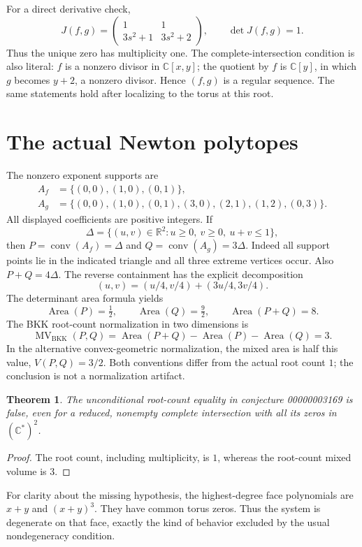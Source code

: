 \documentclass[11pt]{article}
\newtheorem{theorem}{Theorem}
\begin{document}
For a direct derivative check,
\[
 J(f,g)=\begin{pmatrix}1&1\\3s^2+1&3s^2+2\end{pmatrix},
 \qquad \det J(f,g)=1.
\]
Thus the unique zero has multiplicity one. The complete-intersection condition is also literal: $f$ is a nonzero divisor in $\mathbb C[x,y]$; the quotient by $f$ is $\mathbb C[y]$, in which $g$ becomes $y+2$, a nonzero divisor. Hence $(f,g)$ is a regular sequence. The same statements hold after localizing to the torus at this root.
\section{The actual Newton polytopes}
The nonzero exponent supports are
\begin{align*}
 A_f&=\{(0,0),(1,0),(0,1)\},\\
 A_g&=\{(0,0),(1,0),(0,1),(3,0),(2,1),(1,2),(0,3)\}.
\end{align*}
All displayed coefficients are positive integers. If
\[
 \Delta=\{(u,v)\in\mathbb R^2:u\ge0,\ v\ge0,\ u+v\le1\},
\]
then $P=\operatorname{conv}(A_f)=\Delta$ and $Q=\operatorname{conv}(A_g)=3\Delta$. Indeed all support points lie in the indicated triangle and all three extreme vertices occur. Also $P+Q=4\Delta$. The reverse containment has the explicit decomposition
\[
 (u,v)=(u/4,v/4)+(3u/4,3v/4).
\]
The determinant area formula yields
\[
 \operatorname{Area}(P)=\tfrac12,\qquad
 \operatorname{Area}(Q)=\tfrac92,\qquad
 \operatorname{Area}(P+Q)=8.
\]
The BKK root-count normalization in two dimensions is
\[
 \operatorname{MV}_{\mathrm{BKK}}(P,Q)
 =\operatorname{Area}(P+Q)-\operatorname{Area}(P)-\operatorname{Area}(Q)=3.
\]
In the alternative convex-geometric normalization, the mixed area is half this value, $V(P,Q)=3/2$. Both conventions differ from the actual root count $1$; the conclusion is not a normalization artifact.
\begin{theorem}
The unconditional root-count equality in conjecture 00000003169 is false, even for a reduced, nonempty complete intersection with all its zeros in $(\mathbb C^*)^2$.
\end{theorem}
\begin{proof}
The root count, including multiplicity, is $1$, whereas the root-count mixed volume is $3$.
\end{proof}
For clarity about the missing hypothesis, the highest-degree face polynomials are $x+y$ and $(x+y)^3$. They have common torus zeros. Thus the system is degenerate on that face, exactly the kind of behavior excluded by the usual nondegeneracy condition.
\end{document}
